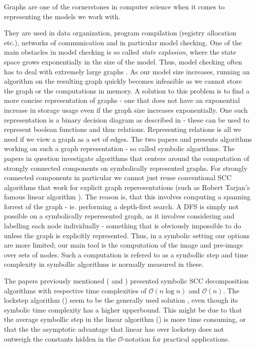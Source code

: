 \documentclass[../master/master.tex]{subfiles}
\begin{document}
Graphs are one of the cornerstones in computer science when it comes to representing the models we work with. 

They are used in data organization,  program compilation (registry allocation etc.), networks of communication and in particular model checking. One of the main obstacles in model checking is so called \textit{state explosion}, where the state space grows exponentially in the size of the model. Thus, model checking often has to deal with extremely large graphs \cite{pelanek_2004}. As our model size increases, running an algorithm on the resulting graph quickly becomes infeasible as we cannot store the graph or the computations in memory. A solution to this problem is to find a more concise representation of graphs - one that does not have an exponential increase in storage usage even if the graph size increases exponentially. One such representation is a binary decision diagram as described in \cite{bryant_1992} - these can be used to represent boolean functions and thus relations. Representing relations is all we need if we view a graph as a set of edges. The two papers \cite{linear} and \cite{lockstep} presents algorithms working on such a graph representation - so called symbolic algorithms. The papers in question investigate algorithms that centers around the computation of strongly connected components on symbolically represented graphs. For strongly connected components in particular we cannot just reuse conventional SCC algorithms that work for explicit graph reperesentations (such as Robert Tarjan's famous linear algorithm \cite{tarjan_1971}). The reason is, that this involves computing a spanning forrest of the graph - ie. performing a depth-first search. A DFS is simply not possible on a symbolically reperesented graph, as it involves considering and labelling each node individually - something that is obviously impossible to do unless the graph is explicitly represented. Thus, in a symbolic setting our options are more limited; our main tool is the computation of the image and pre-image over sets of nodes. Such a computation is refered to as a symbollic step and time complexity in symbollic algorithms is normally measured in these.

The papers previously mentioned (\cite{linear} and \cite{lockstep}) presented symbolic SCC decomposition algorithms with respective time complexities of $\mathcal{O}(n \log n)$ and $\mathcal{O}(n)$. The lockstep algorithm (\cite{lockstep}) seem to be the generally used solution , even though its symbolic time complexity has a higher upperbound. This might be due to that the average symbollic step in the linear algorithm (\cite{linear}) is more time consuming, or that the the asymptotic advantage that linear has over lockstep does not outweigh the constants hidden in the $\mathcal{O} $-notation for practical applications.
\end{document}
